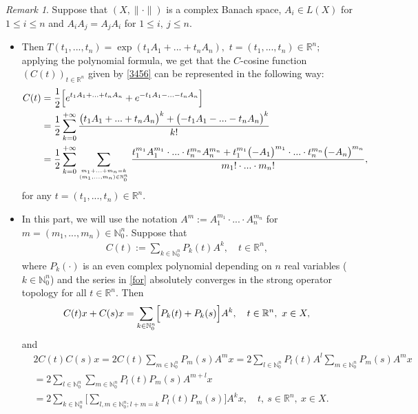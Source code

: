 \documentclass{amsart}
\theoremstyle{definition}
\theoremstyle{remark}
\newtheorem{rem}[thm]{Remark}
\numberwithin{equation}{section}
\begin{document}
\begin{rem}\label{pf}
Suppose that $(X,\| \cdot \|)$ is a complex Banach space, $A_{i}\in L(X)$ for $1\leq i\leq n$ and $A_{i}A_{j}=A_{j}A_{i}$ for $1\leq i,\ j\leq n.$ 
\begin{itemize}
\item[(i)] Then $T(t_{1},...,t_{n})=\exp(t_{1}A_{1}+...+t_{n}A_{n}),$ $t=(t_{1},...,t_{n})\in {\mathbb R}^{n};$ applying the polynomial formula, we get that the $C$-cosine function $(C(t))_{t\in {\mathbb R}^{n}}$ given by \eqref{3456} can be represented in the following way:
\begin{align*}
C(t)&=\frac{1}{2}\Bigl[ e^{t_{1}A_{1}+...+t_{n}A_{n}}+e^{-t_{1}A_{1}-...-t_{n}A_{n}}\Bigr]
\\& =\frac{1}{2}\sum_{k=0}^{+\infty}\frac{\bigl( t_{1}A_{1}+...+t_{n}A_{n}\bigr)^{k}+\bigl( -t_{1}A_{1}-...-t_{n}A_{n}\bigr)^{k}}{k!}
\\& =\frac{1}{2}\sum_{k=0}^{+\infty}\sum_{m_{1}+...+m_{n}=k \atop (m_{1},...,m_{n})\in {\mathbb N}_{0}^{n}}\frac{t_{1}^{m_{1}}A_{1}^{m_{1}}\cdot ... \cdot t_{n}^{m_{n}}A_{n}^{m_{n}}+ t_{1}^{m_{1}}\bigl(-A_{1}\bigr)^{m_{1}}\cdot ... \cdot t_{n}^{m_{n}}\bigl(-A_{n}\bigr)^{m_{n}}}{m_{1}! \cdot ... \cdot m_{n}!},
\end{align*}
for any $t=(t_{1},...,t_{n})\in {\mathbb R}^{n}.$
\item[(ii)] In this part, we will use the notation $A^{m}:= A_{1}^{m_{1}}\cdot ... \cdot A_{n}^{m_{n}}$ for $m=(m_{1},..., m_{n})\in {\mathbb N}_{0}^{n}.$ Suppose that 
\begin{align}\label{for}
C(t):=\sum_{k\in {\mathbb N}_{0}^{n}}P_{k}(t)A^{k},\quad t\in {\mathbb R}^{n},
\end{align} 
where $P_{k}(\cdot)$ is an even complex polynomial depending on $n$ real variables ($k\in {\mathbb N}_{0}^{n}$) and the series in \eqref{for} absolutely converges in the strong operator topology for all $t\in {\mathbb R}^{n}.$ Then
$$
C(t)x+C(s)x=\sum_{k\in {\mathbb N}_{0}^{n}}\Bigl[ P_{k}(t)+P_{k}(s)\Bigr]A^{k},\quad t\in {\mathbb R}^{n},\ x\in X,
$$ 
and
\begin{align*}&
2C(t)C(s)x=2C(t)\sum_{m\in {\mathbb N}_{0}^{n}}P_{m}(s)A^{m}x=2\sum_{l\in {\mathbb N}_{0}^{n}}P_{l}(t)A^{l}\sum_{m\in {\mathbb N}_{0}^{n}}P_{m}(s)A^{m}x
\\& =2\sum_{l\in {\mathbb N}_{0}^{n}}\sum_{m\in {\mathbb N}_{0}^{n}}P_{l}(t) P_{m}(s)A^{m+l}x
\\&=2\sum_{k\in {\mathbb N}_{0}^{n}}\Biggl[ \sum_{l,  m\in {\mathbb N}_{0}^{n}; l+m=k}P_{l}(t) P_{m}(s)\Biggr]A^{k}x,\quad t,\ s\in {\mathbb R}^{n},\ x\in X.

\end{align*}
\end{itemize}
\end{rem}
\end{document}

